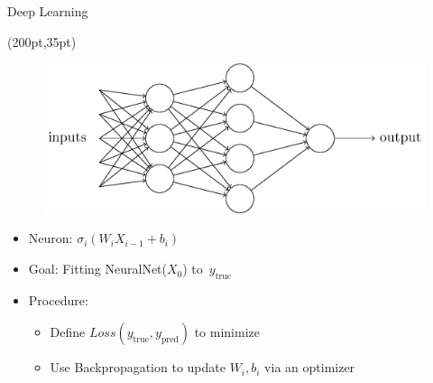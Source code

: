 \documentclass[10pt]{beamer}
\begin{document}
\begin{frame}{Deep Learning}
  \begin{textblock*}{150pt}(200pt,35pt)
    \begin{figure}[htp]
      \includegraphics[width=\textwidth]{tikz1.png}
    \end{figure}
  \end{textblock*}
  \begin{itemize}
  \item Neuron: $\sigma_i(W_i X_{i-1}+b_{i})$
  \item Goal: Fitting NeuralNet($X_0$) to\  $y_{\text{true}}$
  \item Procedure:
    \begin{itemize}
    \item Define $Loss(y_{\text{true}}, y_{\text{pred}})$ to minimize
    \item Use Backpropagation to update $W_i, b_i$ via an optimizer
    \end{itemize}
  \end{itemize}
\end{frame}
\end{document}
